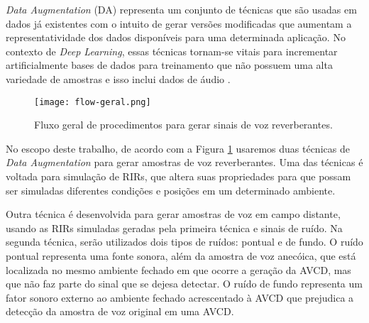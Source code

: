 \textit{Data Augmentation} (DA) representa um conjunto de técnicas que são usadas em dados já existentes com o intuito de gerar versões
modificadas que aumentam a representatividade dos dados disponíveis para uma determinada aplicação. 
No contexto de \textit{Deep Learning}, essas técnicas tornam-se vitais para incrementar artificialmente bases de dados
para treinamento que não possuem uma alta variedade de amostras e isso inclui dados de áudio \cite{DL_Data_Aug_sc,Metric_Data_Aug_sc}.

\begin{figure} [H]
    \centering
    \texttt{[image: flow-geral.png]}
    \caption{Fluxo geral de procedimentos para gerar sinais de voz reverberantes.}
    \label{fig:flow-geral}
\end{figure} 

No escopo deste trabalho, de acordo com a Figura \ref{fig:flow-geral} usaremos duas técnicas de \textit{Data Augmentation} para gerar amostras
de voz reverberantes. Uma das técnicas é voltada para simulação de RIRs, que altera suas propriedades para que possam ser simuladas diferentes condições
e posições em um determinado ambiente.

Outra técnica é desenvolvida para gerar amostras de voz em campo distante, usando as RIRs simuladas geradas pela primeira técnica e sinais de ruído.
Na segunda técnica, serão utilizados dois tipos de ruídos: pontual e de fundo.
O ruído pontual representa uma fonte sonora, além da amostra de voz anecóica, que está localizada no mesmo ambiente fechado em que ocorre 
a geração da AVCD, mas que não faz parte do sinal que se dejesa detectar. 
O ruído de fundo representa um fator sonoro externo ao ambiente fechado acrescentado à AVCD que prejudica a detecção da amostra de voz original em uma AVCD.

 
